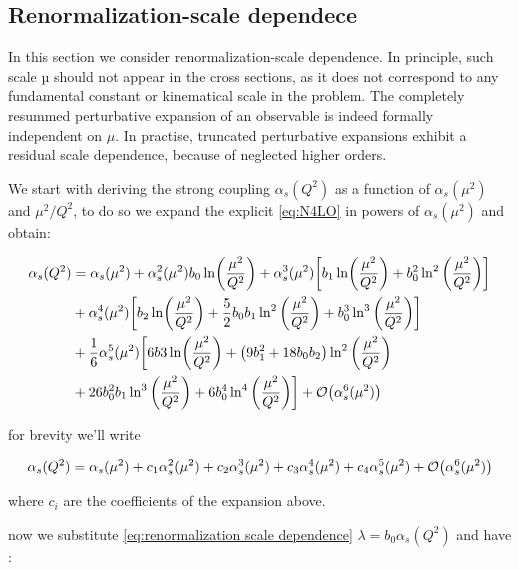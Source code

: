 \documentclass[../main.tex]{subfiles}
\begin{document}
\subsection{Renormalization-scale dependece}
In this section we consider renormalization-scale dependence. In principle, such scale µ should not appear in
the cross sections, as it does not correspond to any fundamental constant or kinematical scale in the problem.
The completely resummed perturbative expansion of an observable is indeed formally independent on $\mu$.
In practise, truncated perturbative expansions exhibit a residual scale dependence, because of neglected higher orders.

We start with deriving the strong coupling $\alpha_s (Q^2)$ as a function of $\alpha_s(\mu^2)$ and $\mu^2/Q^2$, to do so we expand 
the explicit \cref{eq:N4LO} in powers of $\alpha_s(\mu^2)$ and obtain:

\begin{align}
    \begin{split}\label{eq:renormalization scale dependence}
        \alpha_s(Q^2) &= \alpha_s(\mu^2) + \alpha_s^2(\mu^2) b_0 \ln(\frac{\mu^2}{Q^2}) + \alpha_s^3(\mu^2) \biggl[b_1 \ln(\frac{\mu^2}{Q^2}) + b_0^2 \ln^2\qty(\frac{\mu^2}{Q^2})\biggr] \\
        &+ \alpha_s^4 (\mu^2) \biggl[ b_2 \ln(\frac{\mu^2}{Q^2}) + \frac{5}{2} b_0 b_1 \ln^2\qty(\frac{\mu^2}{Q^2}) + b_0^3 \ln^3\qty(\frac{\mu^2}{Q^2})\biggr] \\
        &+ \frac{1}{6} \alpha_s^5(\mu^2) \biggl[6 b3 \ln(\frac{\mu^2}{Q^2}) + \qty(9 b_1^2 + 18 b_0 b_2 ) \ln^2\qty(\frac{\mu^2}{Q^2}) \\
        &+ 26 b_0^2 b_1 \ln^3\qty(\frac{\mu^2}{Q^2}) + 6 b_0^4 \ln^4\qty(\frac{\mu^2}{Q^2}) \biggr] + \order{\alpha_s^6(\mu^2)}
    \end{split}
\end{align}

for brevity we'll write 

\begin{equation}
    \alpha_s(Q^2) = \alpha_s(\mu^2) + c_1 \alpha_s^2(\mu^2) + c_2 \alpha_s^3(\mu^2) + c_3 \alpha_s^4(\mu^2) + c_4 \alpha_s^5(\mu^2) + \order{\alpha_s^6(\mu^2)} 
\end{equation}

where $c_i$ are the coefficients of the expansion above.

now we substitute  \cref{eq:renormalization scale dependence} $\lambda = b_0 \alpha_s(Q^2)$ and have :

\begin{align}
    \begin{split}
        
    \end{split}
\end{align}
\end{document}
